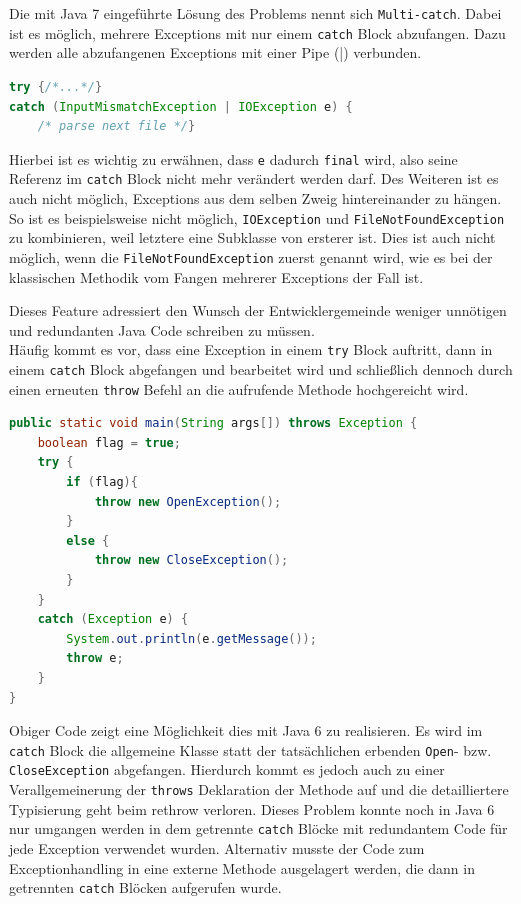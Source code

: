 \documentclass[times, 10pt,twocolumn]{article}
\begin{document}
Die mit Java 7 eingeführte Lösung des Problems nennt sich \texttt{Multi-catch}. Dabei ist es möglich, mehrere Exceptions
mit nur einem \texttt{catch} Block abzufangen. Dazu werden alle abzufangenen Exceptions mit einer Pipe (|) verbunden.\cite{javainsel2}
\begin{lstlisting}[language=java,breaklines=true]
try {/*...*/} 
catch (InputMismatchException | IOException e) {
	/* parse next file */}
\end{lstlisting}
Hierbei ist es wichtig zu erwähnen, dass \texttt{e} dadurch \texttt{final} wird, also seine Referenz im \texttt{catch} Block 
nicht mehr verändert werden darf. Des Weiteren ist es auch nicht möglich, Exceptions aus dem selben Zweig hintereinander
zu hängen. So ist es beispielsweise nicht möglich, \texttt{IOException} und \texttt{FileNotFoundException} zu kombinieren,
weil letztere eine Subklasse von ersterer ist. Dies ist auch nicht möglich, wenn die \texttt{FileNotFoundException} zuerst
genannt wird, wie es bei der klassischen Methodik vom Fangen mehrerer Exceptions der Fall ist.

Dieses Feature adressiert den Wunsch der Entwicklergemeinde weniger unnötigen und redundanten Java Code schreiben zu müssen.\cite{sbJ7exeptions}\\

Häufig kommt es vor, dass eine Exception in einem \texttt{try} Block auftritt, dann in einem \texttt{catch} Block abgefangen und bearbeitet wird und schließlich dennoch durch einen erneuten \texttt{throw} Befehl an die aufrufende Methode hochgereicht wird.

\begin{lstlisting}[language=java,breaklines=true]
public static void main(String args[]) throws Exception {
    boolean flag = true;
    try {
        if (flag){
            throw new OpenException();
        }
        else {
            throw new CloseException();
        }
    }
    catch (Exception e) {
        System.out.println(e.getMessage());
        throw e;
    }
}
\end{lstlisting}

Obiger Code\cite{sbJ7exeptions} zeigt eine Möglichkeit dies mit Java 6 zu realisieren. Es wird im \texttt{catch} Block die allgemeine  Klasse statt der tatsächlichen erbenden \texttt{Open}- bzw. \texttt{CloseException} abgefangen. Hierdurch kommt es jedoch auch zu einer Verallgemeinerung der \texttt{throws} Deklaration der Methode auf  und die detailliertere Typisierung geht beim rethrow verloren. Dieses Problem konnte noch in Java 6 nur umgangen werden in dem getrennte \texttt{catch} Blöcke mit redundantem Code für jede Exception verwendet wurden. Alternativ musste der Code zum Exceptionhandling in eine externe Methode ausgelagert werden, die dann in getrennten \texttt{catch} Blöcken aufgerufen wurde.\cite{scjp6}\\
\end{document}
